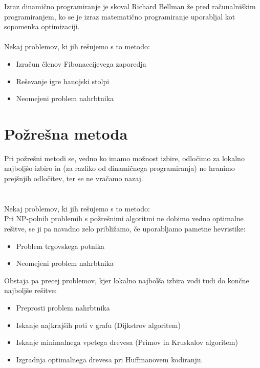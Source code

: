 \documentclass[10pt,a4paper,oneside]{book}
\newenvironment{items}{
\begin{itemize}
  \setlength{\itemsep}{1pt}
  \setlength{\parskip}{0pt}
  \setlength{\parsep}{0pt}
}{\end{itemize}}
\begin{document}
Izraz dinamično programiranje je skoval Richard Bellman že pred računalniškim programiranjem, ko se je izraz matematično programiranje uporabljal kot sopomenka optimizaciji.\\
 \\
Nekaj problemov, ki jih rešujemo s to metodo:
\begin{items}
	\item Izračun členov Fibonaccijevega zaporedja
	\item Reševanje igre hanojski stolpi
	\item Neomejeni problem nahrbtnika
\end{items}

\section{Požrešna metoda}
Pri požrešni metodi se, vedno ko imamo možnost izbire, odločimo za lokalno najboljšo izbiro in (za razliko od dinamičnega programiranja) ne hranimo prejšnjih odločitev, ter se ne vračamo nazaj.\\
 \\
 \\
Nekaj problemov, ki jih rešujemo s to metodo:\\
Pri NP-polnih problemih s požrešnimi algoritmi ne dobimo vedno optimalne rešitve, se ji pa navadno zelo približamo, če uporabljamo pametne hevristike:
\begin{items}
	\item Problem trgovskega potnika
	\item Neomejeni problem nahrbtnika
\end{items}
Obstaja pa precej problemov, kjer lokalno najbolša izbira vodi tudi do končne najboljše rešitve:
\begin{items}
	\item Preprosti problem nahrbtnika
	\item Iskanje najkrajših poti v grafu (Dijkstrov algoritem)
	\item Iskanje minimalnega vpetega drevesa (Primov in Kruskalov algoritem)
	\item Izgradnja optimalnega drevesa pri Huffmanovem kodiranju.
\end{items}

\end{document}
